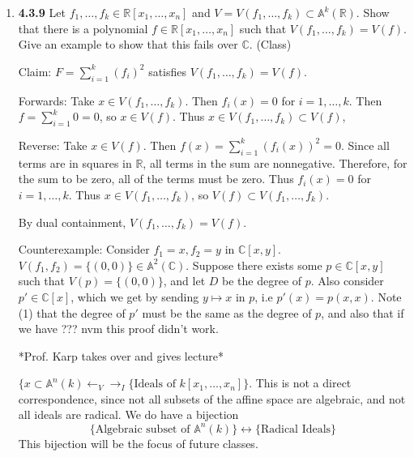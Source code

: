 \documentclass[12pt]{article}
\newcommand{\R}{\mathbb{R}}
\newcommand{\C}{\mathbb{C}}
\newcommand{\A}{\mathbb{A}}
\begin{document}
\begin{enumerate}
      \item \textbf{4.3.9} Let $f_1, \dots, f_k \in \R[x_1, \dots, x_n]$ and $V=V(f_1, \dots, f_k) \subset \A^k(\R)$.  Show that there is a polynomial $f\in \R[x_1, \dots, x_n]$ such that $V(f_1, \dots, f_k) = V(f)$.  Give an example to show that this fails over $\C$.  (Class)
      
      Claim: $F = \sum_{i=1}^k (f_i)^2$ satisfies $V(f_1, \dots, f_k) = V(f)$. 
      
      Forwards: Take $x\in V(f_1, \dots, f_k)$.  Then $f_i(x)=0$ for $i=1,\dots, k$.  Then $f = \sum_{i=1}^k 0 = 0$, so $x\in V(f)$.  Thus $x\in V(f_1, \dots, f_k)\subset V(f)$,
      
      Reverse: Take $x\in V(f)$.  Then $f(x)= \sum_{i=1}^k (f_i(x))^2 = 0$.  Since all terms are in squares in $\R$, all terms in the sum are nonnegative.  Therefore, for the sum to be zero, all of the terms must be zero.  Thus $f_i(x)=0$ for $i=1,\dots, k$. Thus $x\in V(f_1, \dots, f_k)$, so $V(f)\subset V(f_1, \dots, f_k)$.
      
      By dual containment, $V(f_1, \dots, f_k)=V(f)$.
      
      Counterexample: Consider $f_1=x, f_2=y$ in $\C[x,y]$.  $V(f_1, f_2)=\{(0,0)\}\in \A^2(\C)$.  Suppose there exists some $p\in \C[x,y]$ such that $V(p) = \{(0,0)\}$, and let $D$ be the degree of $p$.  Also consider $p'\in \C[x]$, which we get by sending $y\mapsto x$ in $p$, i.e $p'(x) = p(x,x)$.  Note (1) that the degree of $p'$ must be the same as the degree of $p$, and also that if we have ??? nvm this proof didn't work.  
      
      *Prof. Karp takes over and gives lecture*
      
      $\{x\subset \A^n(k) \leftarrow_V \rightarrow_I \{\text{Ideals of }k[x_1, \dots, x_n]\}$.  This is not a direct correspondence, since not all subsets of the affine space are algebraic, and not all ideals are radical.  We do have a bijection
      \[\{\text{Algebraic subset of }\A^n(k)\} \leftrightarrow \{\text{Radical Ideals}\}\]
      This bijection will be the focus of future classes.
   
\end{enumerate}



\end{document}
